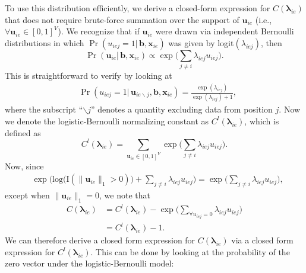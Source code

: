 \documentclass[ba]{imsart}
\numberwithin{equation}{section}
\theoremstyle{plain}
\begin{document}
	To use this distribution efficiently, we derive a closed-form expression for $C(\boldsymbol{\lambda}_{ie})$ that does not require brute-force summation over the support of $\boldsymbol{u}_{ie}$ (i.e., $\forall \boldsymbol{u}_{ie} \in [0,1]^V$). We recognize that if $\boldsymbol{u}_{ie}$ were drawn via independent Bernoulli distributions in which $\Pr({u}_{iej}=1|\,\boldsymbol{b}, \boldsymbol{x}_{ie})$ was given by logit$(\lambda_{iej})$, then
	\begin{equation*}
		\Pr(\boldsymbol{u}_{ie}|\,\boldsymbol{b}, \boldsymbol{x}_{ie}) \propto \exp\Big(\sum_{j\neq i} \lambda_{iej}u_{iej}\Big).
	\end{equation*}
	This is straightforward to verify by looking at 
	\begin{equation*}
		\begin{aligned}
			&\Pr(u_{iej}=1|\,\boldsymbol{u}_{ie\backslash j}, \boldsymbol{b}, \boldsymbol{x}_{ie})
			=\frac{\exp{(\lambda_{iej})}}{\exp{(\lambda_{iej})} + 1},
		\end{aligned}\end{equation*}
		where the subscript ``$\backslash j$'' denotes a quantity excluding data from position $j$. Now we denote the logistic-Bernoulli normalizing constant as $C^{l}(\boldsymbol{\lambda}_{ie})$, which is defined as
		\begin{equation*}
			C^{l}( \boldsymbol{\lambda}_{ie})=\sum_{\boldsymbol{u}_{ie} \in [0,1]^{V}} \exp\Big(\sum_{j\neq i} \lambda_{iej}u_{iej}\Big).
		\end{equation*}
		Now, since 
		\begin{equation*}
			\begin{aligned}
				&\exp\Big(\mbox{log}\Big(\text{I}(\lVert \boldsymbol{u}_{ie} \rVert_1 > 0)\Big) + \sum_{j\neq i} \lambda_{iej}u_{iej} \Big)= \exp\Big( \sum_{j \neq i} \lambda_{iej}u_{iej} \Big),
			\end{aligned}
		\end{equation*}
		except when $\lVert \boldsymbol{u}_{ie} \rVert_1=0$, we note that 
		\begin{equation*}
			\begin{aligned}
				C(\boldsymbol{\lambda}_{ie})& = C^{l}(\boldsymbol{\lambda}_{ie}) -\exp\Big( \sum\limits_{\forall u_{iej}=0}\lambda_{iej}u_{iej} \Big)
				\\& = C^{l}(\boldsymbol{\lambda}_{ie}) -  1.
			\end{aligned}
		\end{equation*}
		We can therefore derive a closed form expression for $C(\boldsymbol{\lambda}_{ie})$ via a closed form expression for $C^{l}(\boldsymbol{\lambda}_{ie})$. This can be done by looking at the probability of the zero vector under the logistic-Bernoulli model:
\end{document}
